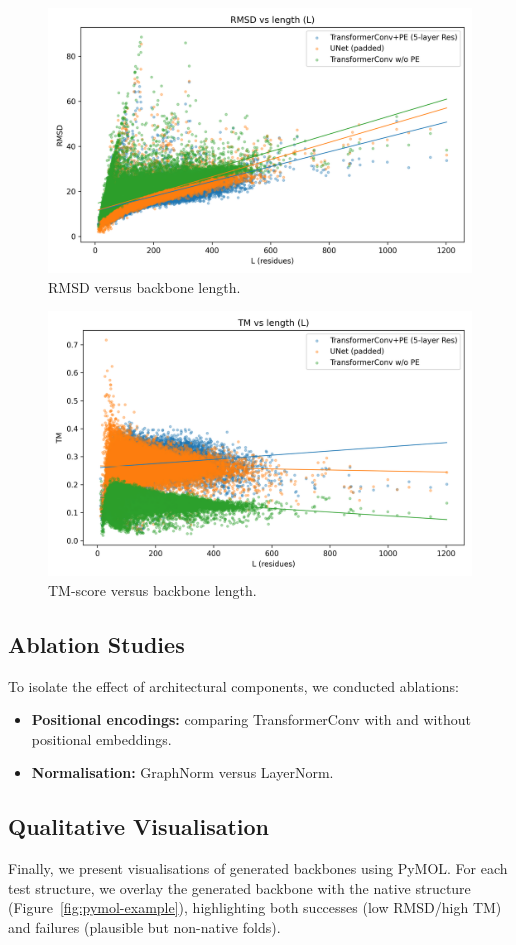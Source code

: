 \documentclass[a4paper,12pt]{article}
\begin{document}
\begin{figure}[htbp]
\centering
\includegraphics[width=0.7\linewidth]{rmsd_vs_L.png}
\caption{RMSD versus backbone length.}
\label{fig:rmsd-vs-l}
\end{figure}

\begin{figure}[htbp]
\centering
\includegraphics[width=0.7\linewidth]{tm_vs_L.png}
\caption{TM-score versus backbone length.}
\label{fig:tm-vs-l}
\end{figure}

\subsection{Ablation Studies}
\label{subsec:ablations}

To isolate the effect of architectural components, we conducted ablations:
\begin{itemize}
    \item \textbf{Positional encodings:} comparing TransformerConv with and without positional embeddings.
    \item \textbf{Normalisation:} GraphNorm versus LayerNorm.
\end{itemize}


\subsection{Qualitative Visualisation}\label{subsec:visualisation}
Finally, we present visualisations of generated backbones using PyMOL. For each test structure, we overlay the generated backbone with the native structure (Figure~\ref{fig:pymol-example}), highlighting both successes (low RMSD/high TM) and failures (plausible but non-native folds).
\end{document}
